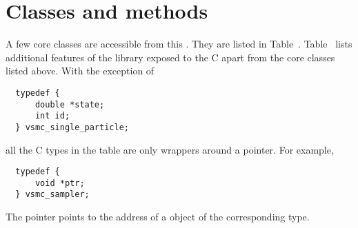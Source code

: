 \section{Classes and methods}
\label{sec:Classes and methods}

A few core classes are accessible from this \api. They are listed in
Table~. Table~
lists additional features of the library exposed to the C \api apart from the
core classes listed above. With the exception of
\begin{Verbatim}
  typedef {
      double *state;
      int id;
  } vsmc_single_particle;
\end{Verbatim}
all the C types in the table are only wrappers around a pointer. For example,
\begin{Verbatim}
  typedef {
      void *ptr;
  } vsmc_sampler;
\end{Verbatim}
The pointer points to the address of a \cpp object of the corresponding type.

